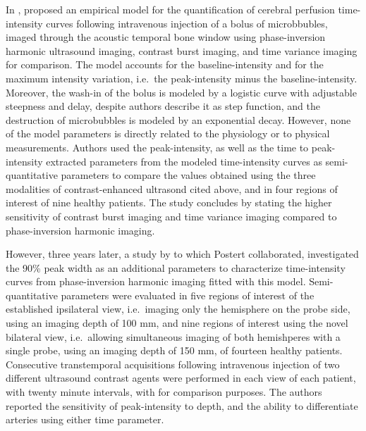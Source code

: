 In \citeyear{Postert:2000kda}, \citet{Postert:2000kda} proposed an empirical model for the quantification of cerebral perfusion time-intensity curves following intravenous injection of a bolus of microbbubles, imaged through the acoustic temporal bone window using phase-inversion harmonic ultrasound imaging, contrast burst imaging, and time variance imaging for comparison. 
The model accounts for the baseline-intensity and for the maximum intensity variation, i.e.~the peak-intensity minus the baseline-intensity. 
Moreover, the wash-in of the bolus is modeled by a logistic curve with adjustable steepness and delay, despite authors describe it as step function, and the destruction of microbubbles is modeled by an exponential decay.
However, none of the model parameters is directly related to the physiology or to physical measurements. 
Authors used the peak-intensity, as well as the time to peak-intensity extracted parameters from the modeled time-intensity curves as semi-quantitative parameters to compare the values obtained using the three modalities of contrast-enhanced ultrasond cited above, and in four regions of interest of nine healthy patients. 
The study concludes by stating the higher sensitivity of contrast burst imaging and time variance imaging compared to phase-inversion harmonic imaging.

However, three years later, a study by \citet{Eyding:2003bo} to which Postert collaborated, investigated the 90\% peak width as an additional parameters to characterize time-intensity curves from phase-inversion harmonic imaging fitted with this model.
Semi-quantitative parameters were evaluated in five regions of interest of the established ipsilateral view, i.e.~imaging only the hemisphere on the probe side, using an imaging depth of 100 mm, and nine regions of interest using the novel bilateral view, i.e.~allowing simultaneous imaging of both hemishperes with a single probe, using an imaging depth of 150 mm, of fourteen healthy patients. 
Consecutive transtemporal acquisitions following intravenous injection of two different ultrasound contrast agents were performed in each view of each patient, with twenty minute intervals, with for comparison purposes.
The authors reported the sensitivity of peak-intensity to depth, and the ability to differentiate arteries using either time parameter.


